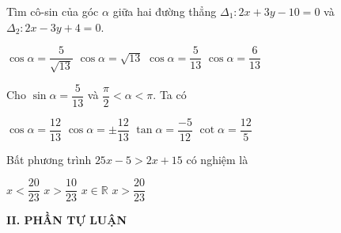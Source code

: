 \begin{ex}%
Tìm cô-sin của góc $\alpha$ giữa hai đường thẳng $\Delta_1: 2x+3y-10 = 0$ và $\Delta_2: 2x-3y+4=0$.

	\choice
{$\cos \alpha = \dfrac{5}{\sqrt{13}}$}
{$\cos \alpha = \sqrt{13}$}
{\True $\cos \alpha = \dfrac{5}{13}$}
{$\cos \alpha = \dfrac{6}{13}$}
\end{ex}

\begin{ex}%
Cho $\sin \alpha =\dfrac{5}{13}$ và $\dfrac{\pi}{2}< \alpha <\pi$. Ta có

	\choice
{$\cos \alpha = \dfrac{12}{13}$}
{$\cos \alpha = \pm \dfrac{12}{13}$}
{\True $\tan \alpha =  \dfrac{-5}{12}$}
{$\cot \alpha = \dfrac{12}{5}$}
\end{ex}

\begin{ex}%
Bất phương trình $25x -5> 2x+15$ có nghiệm là

	\choice
{$x < \dfrac{20}{23}$}
{$x> \dfrac{10}{23}$}
{$x \in \mathbb{R}$}
{\True $x> \dfrac{20}{23}$}
\end{ex}


\noindent\textbf{II. PHẦN TỰ LUẬN}

